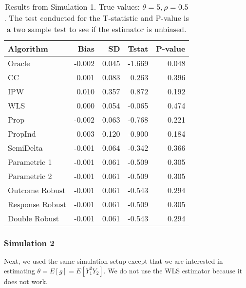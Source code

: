\documentclass[12pt]{article}
\begin{document}
\begin{table}[ht!]
  \caption{Results from Simulation 1. True values: $\theta = 5, \rho = 0.5$.
  The test conducted for the T-statistic and P-value is a two sample test to 
  see if the estimator is unbiased.}
  \label{tab:sim1}
  \centering
  \begin{tabular}[t]{lrrrr}
    \toprule
    Algorithm & Bias & SD & Tstat & P-value\\
    \midrule
    Oracle & -0.002 & 0.045 & -1.669 & 0.048\\
    CC & 0.001 & 0.083 & 0.263 & 0.396\\
    IPW & 0.010 & 0.357 & 0.872 & 0.192\\
    WLS & 0.000 & 0.054 & -0.065 & 0.474\\
    Prop & -0.002 & 0.063 & -0.768 & 0.221\\
    PropInd & -0.003 & 0.120 & -0.900 & 0.184\\
    SemiDelta & -0.001 & 0.064 & -0.342 & 0.366\\
    Parametric 1 & -0.001 & 0.061 & -0.509 & 0.305\\
    Parametric 2 & -0.001 & 0.061 & -0.509 & 0.305\\
    Outcome Robust & -0.001 & 0.061 & -0.543 & 0.294\\
    Response Robust & -0.001 & 0.061 & -0.509 & 0.305\\
    Double Robust & -0.001 & 0.061 & -0.543 & 0.294\\
    \bottomrule
  \end{tabular}
\end{table}

\newpage 

\subsubsection*{Simulation 2}

Next, we used the same simulation setup except that we are interested in 
estimating $\theta = E[g] = E[Y_1^2 Y_2]$. We do not use the WLS estimator 
because it does not work.
\end{document}
